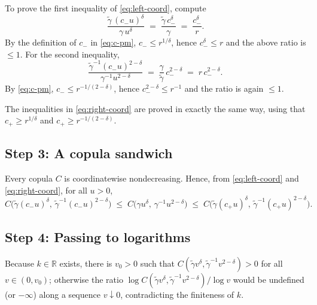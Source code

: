 \documentclass[11pt]{article}
\theoremstyle{definition}
\newcommand{\R}{\mathbb{R}}
\begin{document}
To prove the first inequality of \eqref{eq:left-coord}, compute
\[
\frac{\tilde\gamma\,(c_- u)^{\delta}}{\gamma\,u^{\delta}}
\;=\;
\frac{\tilde\gamma\,c_-^{\delta}}{\gamma}
\;=\;
\frac{c_-^{\delta}}{r}.
\]
By the definition of $c_-$ in \eqref{eq:c-pm}, $c_-\le r^{1/\delta}$,
hence $c_-^{\delta}\le r$ and the above ratio is $\le 1$. For the
second inequality,
\[
\frac{\tilde\gamma^{-1}(c_- u)^{2-\delta}}{\gamma^{-1}u^{2-\delta}}
\;=\;
\frac{\gamma}{\tilde\gamma}\,c_-^{2-\delta}
\;=\;
r\,c_-^{2-\delta}.
\]
By \eqref{eq:c-pm}, $c_-\le r^{-1/(2-\delta)}$, hence
$c_-^{2-\delta}\le r^{-1}$ and the ratio is again $\le 1$.

The inequalities in \eqref{eq:right-coord} are proved in exactly the
same way, using that $c_+\ge r^{1/\delta}$ and
$c_+\ge r^{-1/(2-\delta)}$.

\subsection*{Step 3: A copula sandwich}

Every copula $C$ is coordinatewise nondecreasing. Hence, from
\eqref{eq:left-coord} and \eqref{eq:right-coord}, for all $u>0$,
\begin{equation}\label{eq:C-sandwich}
C\!\bigl(\tilde\gamma(c_- u)^{\delta},\,\tilde\gamma^{-1}(c_- u)^{2-\delta}\bigr)
\;\le\;
C\!\bigl(\gamma u^{\delta},\,\gamma^{-1}u^{2-\delta}\bigr)
\;\le\;
C\!\bigl(\tilde\gamma(c_+ u)^{\delta},\,\tilde\gamma^{-1}(c_+ u)^{2-\delta}\bigr).
\end{equation}

\subsection*{Step 4: Passing to logarithms}

Because $k\in\R$ exists, there is $v_0>0$ such that
$C(\tilde\gamma v^{\delta},\tilde\gamma^{-1}v^{2-\delta})>0$ for all
$v\in(0,v_0)$; otherwise the ratio
$\log C(\tilde\gamma v^{\delta},\tilde\gamma^{-1}v^{2-\delta})/\log v$
would be undefined (or $-\infty$) along a sequence $v\downarrow 0$,
contradicting the finiteness of $k$.
\end{document}
